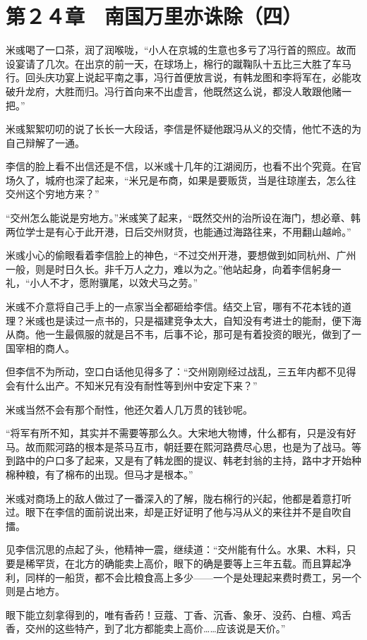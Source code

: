 \section{第２４章　南国万里亦诛除（四）}

米彧喝了一口茶，润了润喉咙，“小人在京城的生意也多亏了冯行首的照应。故而设宴请了几次。在出京的前一天，在球场上，棉行的蹴鞠队十五比三大胜了车马行。回头庆功宴上说起平南之事，冯行首便放言说，有韩龙图和李将军在，必能攻破升龙府，大胜而归。冯行首向来不出虚言，他既然这么说，都没人敢跟他赌一把。”

米彧絮絮叨叨的说了长长一大段话，李信是怀疑他跟冯从义的交情，他忙不迭的为自己辩解了一通。

李信的脸上看不出信还是不信，以米彧十几年的江湖阅历，也看不出个究竟。在官场久了，城府也深了起来，“米兄是布商，如果是要贩货，当是往琼崖去，怎么往交州这个穷地方来？”

“交州怎么能说是穷地方。”米彧笑了起来，“既然交州的治所设在海门，想必章、韩两位学士是有心于此开港，日后交州财货，也能通过海路往来，不用翻山越岭。”

米彧小心的偷眼看着李信脸上的神色，“不过交州开港，要想做到如同杭州、广州一般，则是时日久长。非千万人之力，难以为之。”他站起身，向着李信躬身一礼，“小人不才，愿附骥尾，以效犬马之劳。”

米彧不介意将自己手上的一点家当全都砸给李信。结交上官，哪有不花本钱的道理？米彧也是读过一点书的，只是福建竞争太大，自知没有考进士的能耐，便下海从商。他一生最佩服的就是吕不韦，后事不论，那可是有着投资的眼光，做到了一国宰相的商人。

但李信不为所动，空口白话他见得多了：“交州刚刚经过战乱，三五年内都不见得会有什么出产。不知米兄有没有耐性等到州中安定下来？”

米彧当然不会有那个耐性，他还欠着人几万贯的钱钞呢。

“将军有所不知，其实并不需要等那么久。大宋地大物博，什么都有，只是没有好马。故而熙河路的根本是茶马互市，朝廷要在熙河路费尽心思，也是为了战马。等到路中的户口多了起来，又是有了韩龙图的提议、韩老封翁的主持，路中才开始种棉种粮，有了棉布的出现。但马才是根本。”

米彧对商场上的敌人做过了一番深入的了解，陇右棉行的兴起，他都是着意打听过。眼下在李信的面前说出来，却是正好证明了他与冯从义的来往并不是自吹自擂。

见李信沉思的点起了头，他精神一震，继续道：“交州能有什么。水果、木料，只要是稀罕货，在北方的确能卖上高价，眼下的确是要等上三年五载。而且算起净利，同样的一船货，都不会比粮食高上多少——一个是处理起来费时费工，另一个则是占地方。

眼下能立刻拿得到的，唯有香药！豆蔻、丁香、沉香、象牙、没药、白檀、鸡舌香，交州的这些特产，到了北方都能卖上高价……应该说是天价。”

